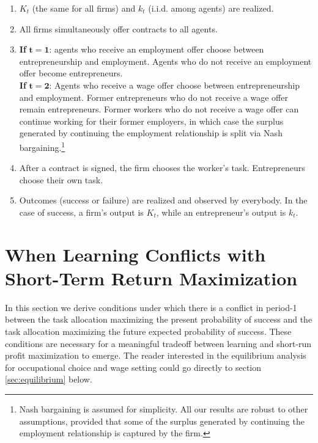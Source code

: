 \documentclass[12pt,american]{paper}
\theoremstyle{remark}
\begin{document}
\begin{enumerate}[(1)]\itemsep=0.05em
	\item  $K_t$ (the same for all firms) and  $k_t$ (i.i.d. among agents) are realized.
   \item All firms simultaneously offer contracts to all agents.  
    \item \textbf{If} $\mathbf{t=1}$: agents who receive an employment offer choose between entrepreneurship and employment. Agents who do not receive an employment offer become entrepreneurs.\\
    \textbf{If}  $\mathbf{t=2}$: Agents who receive a wage offer choose between entrepreneurship and employment. Former entrepreneurs who do not receive a wage offer remain entrepreneurs. Former workers  who do not receive a wage offer can continue working for their former employers, in which case the surplus generated by continuing the employment relationship is split via Nash bargaining.\footnote{Nash bargaining is assumed for simplicity. All our results are robust to other assumptions, provided that some of the surplus generated by continuing the employment relationship is captured by the firm.}
    \item After a contract is signed, the firm chooses the worker's task. Entrepreneurs choose their own task.
	\item Outcomes (success or failure) are realized and observed by everybody.  
In the case of success, a firm's output is $K_t$, while an entrepreneur's output is $k_{t}$.
	\end{enumerate}




 
\section{When Learning Conflicts with Short-Term Return Maximization\label{sec:learning}}
In this section we derive conditions under which there is a conflict in period-1 between the task allocation maximizing the present probability of success and the task allocation maximizing the future expected probability of success.  These conditions are necessary for a meaningful tradeoff between learning and short-run profit maximization to emerge. %
The reader interested in the equilibrium analysis for occupational choice and wage setting could go directly to section \ref{sec:equilibrium} below.
\end{document}
